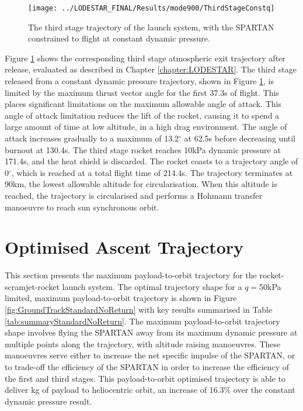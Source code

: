 \begin{figure}[ht!]
\centering
\texttt{[image: ../LODESTAR\_FINAL/Results/mode900/ThirdStageConstq]}
\caption{The third stage trajectory of the launch system, with the SPARTAN constrained to flight at constant dynamic pressure.}
\label{fig:ThirdStageConstq}
\end{figure}

Figure \ref{fig:ThirdStageConstq} shows the corresponding third stage atmospheric exit trajectory after release, evaluated as described in Chapter \ref{chapter:LODESTAR}. The third stage released from a constant dynamic pressure trajectory, shown in Figure \ref{fig:ThirdStageConstq}, is limited by the maximum thrust vector angle for the first 37.3s of flight. This places significant limitations on the maximum allowable angle of attack. This angle of attack limitation reduces the lift of the rocket, causing it to spend a large amount of time at low altitude, in a high drag environment. The angle of attack increases gradually to a maximum of 13.2$^\circ$ at 62.5s before decreasing until burnout at 130.4s. The third stage rocket reaches 10kPa dynamic pressure at 171.4s, and the heat shield is discarded. The rocket coasts to a trajectory angle of 0$^\circ$, which is reached at a total flight time of 214.4s. The trajectory terminates at 90km, the lowest allowable altitude for circularisation. 
When this altitude is reached, the trajectory is circularised and performs a Hohmann transfer manoeuvre to reach sun synchronous orbit.








\section{Optimised Ascent Trajectory}

This section presents the maximum payload-to-orbit trajectory for the rocket-scramjet-rocket launch system. 
The optimal trajectory shape for a $q=$50kPa limited, maximum payload-to-orbit trajectory is shown in Figure \ref{fig:GroundTrackStandardNoReturn} with key results summarised in Table \ref{tab:summaryStandardNoReturn}. The maximum payload-to-orbit trajectory shape involves flying the SPARTAN away from its maximum dynamic pressure at multiple points along the trajectory, with altitude raising manoeuvres. These manoeuvres serve either to increase the net specific impulse of the SPARTAN, or to trade-off the efficiency of the SPARTAN in order to increase the efficiency of the first and third stages. 
This payload-to-orbit optimised trajectory is able to deliver \PayloadToOrbitStandardNoReturn kg of payload to heliocentric orbit, an increase of 16.3\% over the constant dynamic pressure result.

